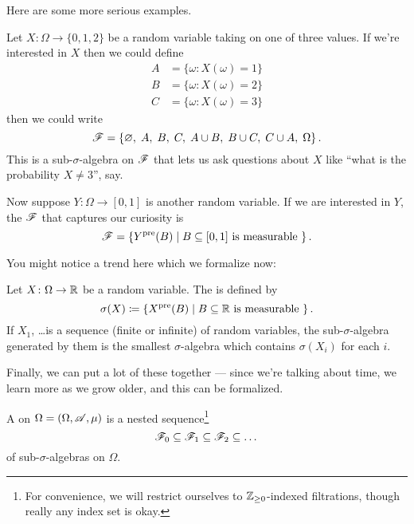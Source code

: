 Here are some more serious examples.
\begin{example}
	\listhack
	\begin{enumerate}[(a)]
		\ii Let $X \colon \Omega \to \{0,1,2\}$ be a random
		variable taking on one of three values.
		If we're interested in $X$ then we could define
		\begin{align*}
			A &= \{\omega \colon X(\omega) = 1\} \\
			B &= \{\omega \colon X(\omega) = 2\} \\
			C &= \{\omega \colon X(\omega) = 3\}
		\end{align*}
		then we could write
		\[ \mathscr F = \left\{ \varnothing, \; A, \; B, \; C, \;
				A \cup B, \; B \cup C, \; C \cup A, \; \Omega \right\}. \]
		This is a sub-$\sigma$-algebra on $\mathscr F$
		that lets us ask questions about $X$
		like ``what is the probability $X \neq 3$'', say.

		\ii Now suppose $Y \colon \Omega \to [0,1]$ is another random variable.
		If we are interested in $Y$,
		the $\mathscr F$ that captures our curiosity is
		\[ \mathscr F = \left\{ Y^{\text{pre}}(B) \mid B \subseteq [0,1]
			\text{ is measurable } \right\}. \]
	\end{enumerate}
\end{example}

You might notice a trend here which we formalize now:
\begin{definition}
	Let $X \colon \Omega \to \mathbb R$ be a random variable.
	The  is defined by
	\[ \sigma(X) \coloneqq \left\{ X^{\text{pre}}(B) \mid B \subseteq \mathbb R
		\text{ is measurable } \right\}. \]
	If $X_1$, \dots is a sequence (finite or infinite) of random variables,
	the sub-$\sigma$-algebra generated by them
	is the smallest $\sigma$-algebra which contains $\sigma(X_i)$ for each $i$.
\end{definition}

Finally, we can put a lot of these together ---
since we're talking about time, we learn more as we grow older,
and this can be formalized.
\begin{definition}
	A  on $\Omega = (\Omega, \mathscr A, \mu)$
	is a nested sequence\footnote{For convenience,
		we will restrict ourselves to $\mathbb Z_{\ge0}$-indexed
		filtrations, though really any index set is okay.}
	\[ \mathscr F_0 \subseteq \mathscr F_1 \subseteq \mathscr F_2 \subseteq \dots \]
	of sub-$\sigma$-algebras on $\Omega$.
\end{definition}


